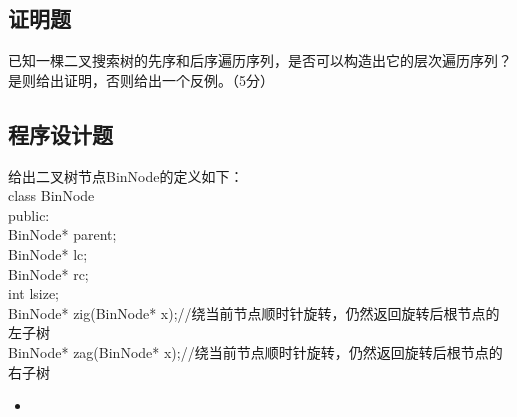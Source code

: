\documentclass[UTF8,12pt]{ctexart}
\begin{document}
	\subsection{证明题}

		已知一棵二叉搜索树的先序和后序遍历序列，是否可以构造出它的层次遍历序列？是则给出证明，否则给出一个反例。（5分）

	\subsection{程序设计题}

		给出二叉树节点BinNode的定义如下：\\

		\noindent class BinNode{\\
		public:\\
			\indent BinNode* parent;\\
			\indent BinNode* lc;\\
			\indent BinNode* rc;\\
			\indent int lsize;\\

			\indent BinNode* zig(BinNode* x);//绕当前节点顺时针旋转，仍然返回旋转后根节点的左子树\\
			\indent BinNode* zag(BinNode* x);//绕当前节点顺时针旋转，仍然返回旋转后根节点的右子树\\
		}

		\begin{itemize}

			\item[]

		\end{itemize}
\end{document}
